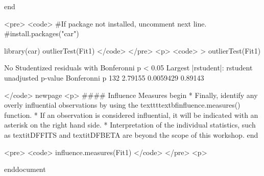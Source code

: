 end{ }

<pre>
<code>
#If package not installed, uncomment next line.
#install.packages("car")

library(car)
outlierTest(Fit1)
</code> 
</pre>
<p>
<code>
> outlierTest(Fit1)

No Studentized residuals with Bonferonni p < 0.05
Largest |rstudent|:
    rstudent unadjusted p-value Bonferonni p
132  2.79155          0.0059429      0.89143

</code>
newpage
<p>
#### {Influence Measures}
begin{ }
         * Finally, identify any overly influential observations by using the texttt{textbf{influence.measures()}} 
function.
         * If an observation is considered influential, it will be indicated with an asterisk on the right hand side.          * Interpretation of the individual statistics, such as textit{DFFITS} and textit{DFBETA} are beyond the scope of this workshop.
end{ }


<pre>
<code>
influence.measures(Fit1)
</code> 
</pre>
<p>

end{document}
